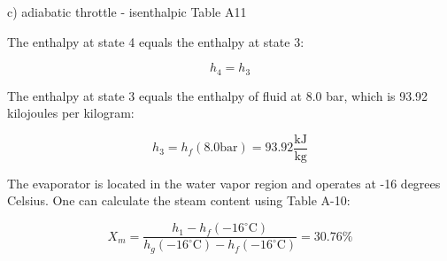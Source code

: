 c) adiabatic throttle - isenthalpic Table A11

The enthalpy at state 4 equals the enthalpy at state 3:

\[ h_4 = h_3 \]

The enthalpy at state 3 equals the enthalpy of fluid at 8.0 bar, which is 93.92 kilojoules per kilogram:

\[ h_3 = h_f (8.0 \text{bar}) = 93.92 \frac{\text{kJ}}{\text{kg}} \]

The evaporator is located in the water vapor region and operates at -16 degrees Celsius. One can calculate the steam content using Table A-10:

\[ X_m = \frac{h_1 - h_f (-16^\circ \text{C})}{h_g (-16^\circ \text{C}) - h_f (-16^\circ \text{C})} = 30.76\% \]